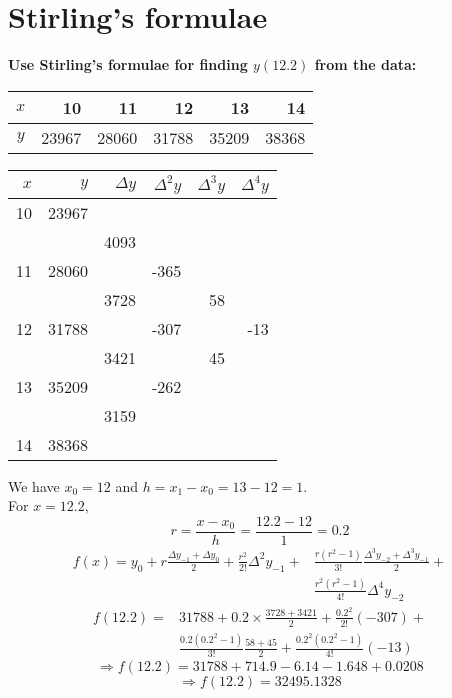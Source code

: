 \documentclass[]{book}
\begin{document}
\section{Stirling's formulae}
\textbf{Use Stirling's formulae for finding $y(12.2)$ from the data:}
\begin{center}
\begin{tabular}{|c|r|r|r|r|r|}
\hline
$x$ & 10 & 11 & 12 & 13 & 14\\
\hline
$y$ & 23967 & 28060 & 31788 & 35209 & 38368\\
\hline
\end{tabular}
\end{center}
\begin{center}
\begin{tabular}{r|rrrrr}
$x$ & $y$ & $\Delta y$ & ${\Delta}^{2} y$ & ${\Delta}^{3} y$ & ${\Delta}^{4} y$\\
\hline
10 & 23967 & & & & \\
& & 4093 & & &\\
11 & 28060 & & -365 & &\\
& & 3728 & & 58 &\\
12 & 31788 & & -307 & & -13\\
& & 3421 & & 45 &\\
13 & 35209 & & -262 & &\\
& & 3159 & & &\\
14 & 38368 & & & &
\end{tabular}
\end{center}
We have $x_{0} = 12$ and $h = x_{1}-x_{0} = 13 - 12 = 1$.\\
For $x = 12.2$, $$r=\dfrac{x-x_{0}}{h}=\dfrac{12.2-12}{1} = 0.2$$
\begin{equation*}
\begin{aligned}
f(x) = y_{0} +r\frac{\Delta y_{-1}+\Delta y_{0}}{2}+\frac{r^{2}}{2!}{\Delta}^{2}y_{-1}+ & \frac{r\left(r^{2}-1\right)}{3!}\frac{{\Delta}^{3}y_{-2}+{\Delta}^{3}y_{-1}}{2}+ \\ & \frac{r^{2}\left(r^{2}-1\right)}{4!}{\Delta}^{4}y_{-2}
\end{aligned}
\end{equation*}
\begin{equation*}
\begin{aligned}
f(12.2) = & 31788 +0.2\times\frac{3728+3421}{2}+\frac{0.2^{2}}{2!}(-307)+\\
& \frac{0.2(0.2^{2}-1)}{3!}\frac{58+45}{2}+\frac{0.2^{2}(0.2^{2}-1)}{4!}(-13)
\end{aligned}
\end{equation*}
$$ \Rightarrow f(12.2) = 31788+714.9 -6.14 -1.648 + 0.0208$$
$$\Rightarrow \boxed{f(12.2) = 32495.1328}$$
\end{document}
